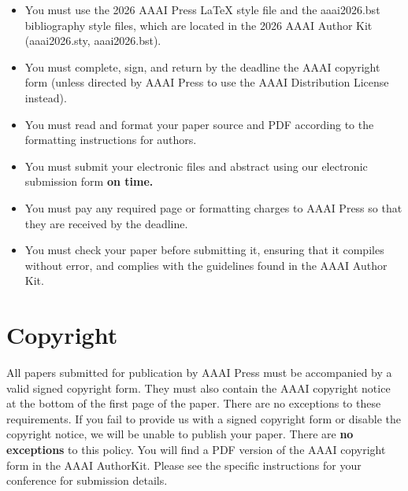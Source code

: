 \documentclass[letterpaper]{article} %
\begin{document}
\begin{itemize}
\item You must use the 2026 AAAI Press \LaTeX{} style file and the aaai2026.bst bibliography style files, which are located in the 2026 AAAI Author Kit (aaai2026.sty, aaai2026.bst).
\item You must complete, sign, and return by the deadline the AAAI copyright form (unless directed by AAAI Press to use the AAAI Distribution License instead).
\item You must read and format your paper source and PDF according to the formatting instructions for authors.
\item You must submit your electronic files and abstract using our electronic submission form \textbf{on time.}
\item You must pay any required page or formatting charges to AAAI Press so that they are received by the deadline.
\item You must check your paper before submitting it, ensuring that it compiles without error, and complies with the guidelines found in the AAAI Author Kit.
\end{itemize}

\ifdefined\aaaianonymous
\else
\section{Copyright}
All papers submitted for publication by AAAI Press must be accompanied by a valid signed copyright form. They must also contain the AAAI copyright notice at the bottom of the first page of the paper. There are no exceptions to these requirements. If you fail to provide us with a signed copyright form or disable the copyright notice, we will be unable to publish your paper. There are \textbf{no exceptions} to this policy. You will find a PDF version of the AAAI copyright form in the AAAI AuthorKit. Please see the specific instructions for your conference for submission details.
\fi
\end{document}
